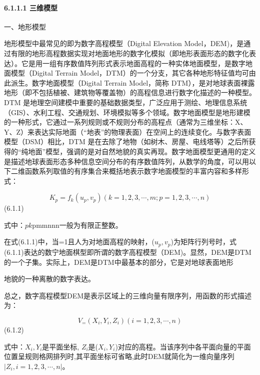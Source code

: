 \hypertarget{ux4e09ux7ef4ux6a21ux578b}{%
\paragraph{6.1.1.1 三维模型}\label{ux4e09ux7ef4ux6a21ux578b}}

一、地形模型

地形模型中最常见的即为数字高程模型（Digital Elevation Model，DEM)，是通过有限的地形高程数据实现对地面地形的数字化模拟（即地形表面形态的数字化表达）。它是用一组有序数值阵列形式表示地面高程的一种实体地面模型，是数字地面模型（Digital Terrain Model，DTM）的一个分支，其它各种地形特征值均可由此派生。数字地面模型（Digital Terrain Model，简称 DTM），是对地球表面裸露地形（即不包括植被、建筑物等覆盖物）的高程信息进行数字化描述的一种模型。DTM 是地理空间建模中重要的基础数据类型，广泛应用于测绘、地理信息系统（GIS）、水利工程、交通规划、环境模拟等多个领域。数字地面模型是地形建模的一种形式，它通过一系列规则或不规则分布的高程点（通常为三维坐标：X、Y、Z）来表达实际地面（``地表''的物理表面）在空间上的连续变化。与数字表面模型（DSM）相比，DTM 是在去除了地物（如树木、房屋、电线塔等）之后所获得的``纯地面''模型，强调的是对自然地貌的真实再现。数字地面模型更通用的定义是描述地球表面形态多种信息空间分布的有序数值阵列，从数学的角度，可以用以下二维函数系列取值的有序集合来概括地表示数字地面模型的丰富内容和多样形式：

\[
K_p = f_k(u_p,v_p)(k=1,2,3,\cdots,m;p=1,2,3,\cdots,n)
\] (6.1.1)

式中：\(p\)\(k\)pmmnnn一般为有限正整数。

在式(6.1.1)中，当=1且人为对地面高程的映射，(\(u_p,v_p\))为矩阵行列号时，式(6.1.1)表达的数宁地面棋型即所谓的数字高程模型（DEM)。显然，DEM是DTM的一个子集。实际上，DEM是DTM中最基本的部分，它是对地球表面地形

地貌的一种离散的数字表达。

总之，数字高程模型DEM是表示区域上的三维向量有限序列，用函数的形式描述为：

\[
V_=(X_i,Y_i,Z_i)(i=1,2,3,\cdots,n)
\] (6.1.2)

式中：\(X_i,Y_i\)是平面坐标, \(Z_i\)是(\(X_i,Y_i\))对应的高程。当该序列中各平面向量的平面位置呈规则格网排列时,其平面坐标可省略,此时DEM就简化为一维向量序列\(|Z_i,i=1,2,3,\cdots,n|\)。

